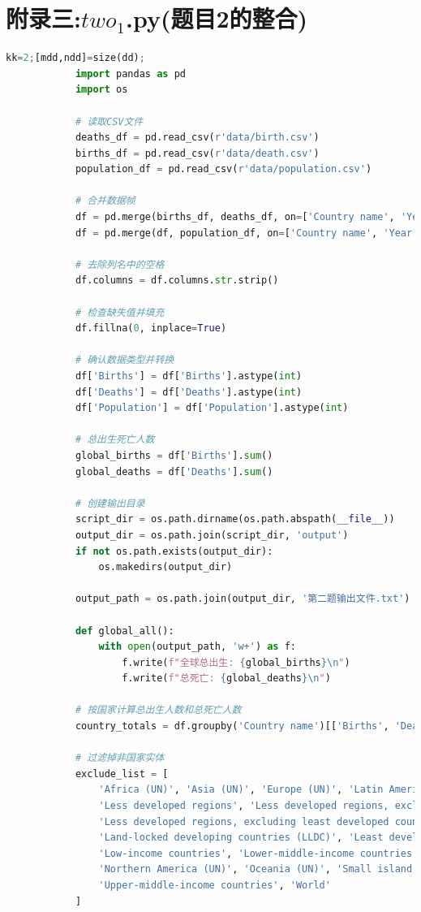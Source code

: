 \documentclass{ctexart}
\begin{document}
    \section{附录三:$two_1$.py(题目2的整合)}
    \tiny
        \begin{lstlisting}[language=Python] %设置不同语言即可。
            kk=2;[mdd,ndd]=size(dd);
            import pandas as pd
            import os

            # 读取CSV文件
            deaths_df = pd.read_csv(r'data/birth.csv')
            births_df = pd.read_csv(r'data/death.csv')
            population_df = pd.read_csv(r'data/population.csv')

            # 合并数据帧
            df = pd.merge(births_df, deaths_df, on=['Country name', 'Year'], how='inner')
            df = pd.merge(df, population_df, on=['Country name', 'Year'], how='inner')

            # 去除列名中的空格
            df.columns = df.columns.str.strip()

            # 检查缺失值并填充
            df.fillna(0, inplace=True)

            # 确认数据类型并转换
            df['Births'] = df['Births'].astype(int)
            df['Deaths'] = df['Deaths'].astype(int)
            df['Population'] = df['Population'].astype(int)

            # 总出生死亡人数
            global_births = df['Births'].sum()
            global_deaths = df['Deaths'].sum()

            # 创建输出目录
            script_dir = os.path.dirname(os.path.abspath(__file__))
            output_dir = os.path.join(script_dir, 'output')
            if not os.path.exists(output_dir):
                os.makedirs(output_dir)

            output_path = os.path.join(output_dir, '第二题输出文件.txt')

            def global_all():
                with open(output_path, 'w+') as f:
                    f.write(f"全球总出生: {global_births}\n")
                    f.write(f"总死亡: {global_deaths}\n")

            # 按国家计算总出生人数和总死亡人数
            country_totals = df.groupby('Country name')[['Births', 'Deaths', 'Population']].sum()

            # 过滤掉非国家实体
            exclude_list = [
                'Africa (UN)', 'Asia (UN)', 'Europe (UN)', 'Latin America and the Caribbean (UN)', 
                'Less developed regions', 'Less developed regions, excluding China', 
                'Less developed regions, excluding least developed countries', 'High-income countries', 
                'Land-locked developing countries (LLDC)', 'Least developed countries', 
                'Low-income countries', 'Lower-middle-income countries', 'More developed regions', 
                'Northern America (UN)', 'Oceania (UN)', 'Small island developing states (SIDS)', 
                'Upper-middle-income countries', 'World'
            ]


\end{lstlisting}
\end{document}
